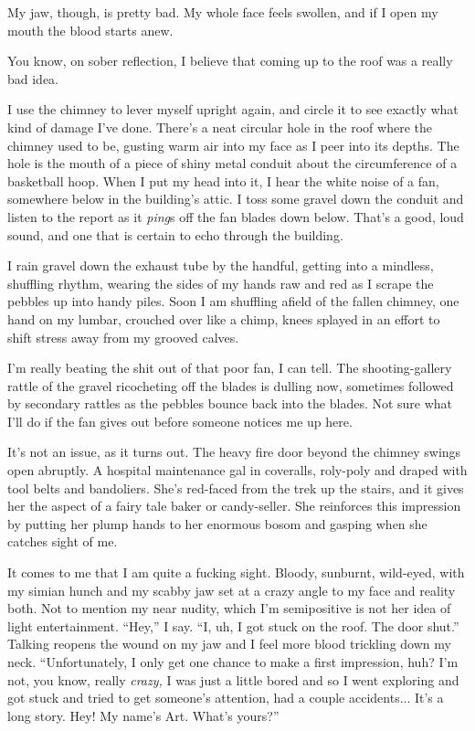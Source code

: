 My jaw, though, is pretty bad. My whole face feels swollen, and if
I open my mouth the blood starts anew.

You know, on sober reflection, I believe that coming up to the roof
was a really bad idea.

I use the chimney to lever myself upright again, and circle it to
see exactly what kind of damage I’ve done. There’s a neat circular
hole in the roof where the chimney used to be, gusting warm air
into my face as I peer into its depths. The hole is the mouth of a
piece of shiny metal conduit about the circumference of a
basketball hoop. When I put my head into it, I hear the white noise
of a fan, somewhere below in the building’s attic. I toss some
gravel down the conduit and listen to the report as it \emph{ping}s
off the fan blades down below. That’s a good, loud sound, and one
that is certain to echo through the building.

I rain gravel down the exhaust tube by the handful, getting into a
mindless, shuffling rhythm, wearing the sides of my hands raw and
red as I scrape the pebbles up into handy piles. Soon I am
shuffling afield of the fallen chimney, one hand on my lumbar,
crouched over like a chimp, knees splayed in an effort to shift
stress away from my grooved calves.

I’m really beating the shit out of that poor fan, I can tell. The
shooting-gallery rattle of the gravel ricocheting off the blades is
dulling now, sometimes followed by secondary rattles as the pebbles
bounce back into the blades. Not sure what I’ll do if the fan gives
out before someone notices me up here.

It’s not an issue, as it turns out. The heavy fire door beyond the
chimney swings open abruptly. A hospital maintenance gal in
coveralls, roly-poly and draped with tool belts and bandoliers.
She’s red-faced from the trek up the stairs, and it gives her the
aspect of a fairy tale baker or candy-seller. She reinforces this
impression by putting her plump hands to her enormous bosom and
gasping when she catches sight of me.

It comes to me that I am quite a fucking sight. Bloody, sunburnt,
wild-eyed, with my simian hunch and my scabby jaw set at a crazy
angle to my face and reality both. Not to mention my near nudity,
which I’m semipositive is not her idea of light entertainment.
“Hey,” I say. “I, uh, I got stuck on the roof. The door shut.”
Talking reopens the wound on my jaw and I feel more blood trickling
down my neck. “Unfortunately, I only get one chance to make a first
impression, huh? I’m not, you know, really \emph{crazy,} I was just
a little bored and so I went exploring and got stuck and tried to
get someone’s attention, had a couple accidents... It’s a long
story. Hey! My name’s Art. What’s yours?”

